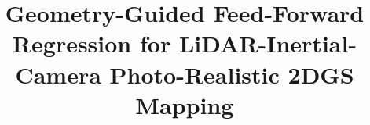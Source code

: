 \documentclass[lettersize,journal]{IEEEtran}
\begin{document}
\title{Geometry-Guided Feed-Forward Regression for LiDAR-Inertial-Camera Photo-Realistic 2DGS Mapping}
\author{}

\maketitle









\clearpage

\end{document}
